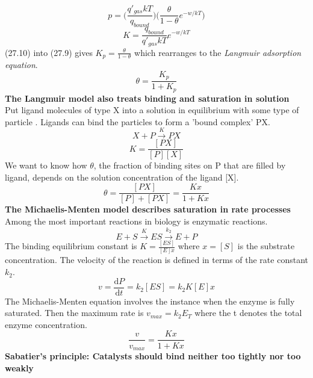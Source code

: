 \documentclass[8pt]{article}
\numberwithin{equation}{section}
\begin{document}
\begin{multicols}{2}
\begin{equation}
p=\bigg(\frac{q'_{gas}kT}{q_{bound}} \bigg)\bigg(\frac{\theta}{1-\theta}e^{-w/kT} \bigg) \tag{27.9}
\end{equation}
\begin{equation}
K=\frac{q_{bound}}{q'_{gas}kT}e^{-w/kT} \tag{27.10}
\end{equation}
(27.10) into (27.9) gives $K_{p}=\frac{\theta}{1-\theta}$ which rearranges to the \textit{Langmuir adsorption equation}.
\begin{equation}
\theta=\frac{K_{p}}{1+K_{p}} \tag{27.12}
\end{equation}
\textbf{The Langmuir model also treats binding and saturation in solution} \\ 
Put ligand molecules of type X into a solution in equilibrium with some type of particle . Ligands can bind the particles to form a 'bound complex' PX.
\begin{equation}
X+P\xrightarrow{K}PX \tag{27.16}
\end{equation}
\begin{equation}
K=\frac{[PX]}{[P][X]} \tag{27.17}
\end{equation}
We want to know how $\theta$, the fraction of binding sites on P that are filled by ligand, depends on the solution concentration of the ligand [X].
\begin{equation}
\theta=\frac{[PX]}{[P]+[PX]}=\frac{Kx}{1+Kx} \tag{27.18}
\end{equation}
\textbf{The Michaelis-Menten model describes saturation in rate processes} \\
Among the most important reactions in biology is enzymatic reactions. 
\begin{equation}
E+S\xrightarrow{K}ES\xrightarrow{k_{2}}E+P \tag{27.23}
\end{equation}
The binding equilibrium constant is $K=\frac{[ES]}{[E]x}$ where $x=[S]$ is the substrate concentration. The velocity of the reaction is defined in terms of the rate constant $k_{2}$.
\begin{equation}
v=\frac{\mathrm{d}P}{\mathrm{d}t}=k_{2}[ES]=k_{2}K[E]x \tag{27.25}
\end{equation}
The Michaelis-Menten equation involves the instance when the enzyme is fully saturated. Then the maximum rate is $v_{max}=k_{2}E_{T}$ where the t denotes the total enzyme concentration. 
\begin{equation}
\frac{v}{v_{max}}=\frac{Kx}{1+Kx} \tag{27.28}
\end{equation} 
\textbf{Sabatier's principle: Catalysts should bind neither too tightly nor too weakly} \\

\end{multicols}
\end{document}

